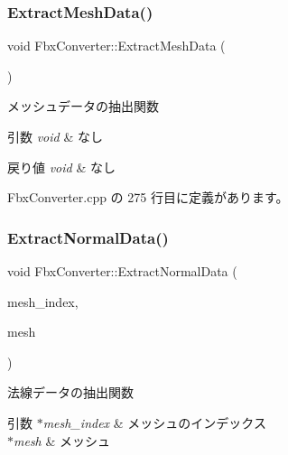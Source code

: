 \subsubsection{\texorpdfstring{Extract\+Mesh\+Data()}{ExtractMeshData()}}
{\footnotesize\ttfamily void Fbx\+Converter\+::\+Extract\+Mesh\+Data (\begin{DoxyParamCaption}{ }\end{DoxyParamCaption})\hspace{0.3cm}{\ttfamily [private]}}



メッシュデータの抽出関数 


\begin{DoxyParams}{引数}
{\em void} & なし \\
\hline
\end{DoxyParams}

\begin{DoxyRetVals}{戻り値}
{\em void} & なし \\
\hline
\end{DoxyRetVals}


 Fbx\+Converter.\+cpp の 275 行目に定義があります。

\mbox{\label{class_fbx_converter_a1333d3fe7a3ab69f7121265117e56b7f}} 
\subsubsection{\texorpdfstring{Extract\+Normal\+Data()}{ExtractNormalData()}}
{\footnotesize\ttfamily void Fbx\+Converter\+::\+Extract\+Normal\+Data (\begin{DoxyParamCaption}\item[{int}]{mesh\+\_\+index,  }\item[{Fbx\+Mesh $\ast$}]{mesh }\end{DoxyParamCaption})\hspace{0.3cm}{\ttfamily [private]}}



法線データの抽出関数 


\begin{DoxyParams}{引数}
{\em $\ast$mesh\+\_\+index} & メッシュのインデックス \\
\hline
{\em $\ast$mesh} & メッシュ \\
\hline
\end{DoxyParams}

